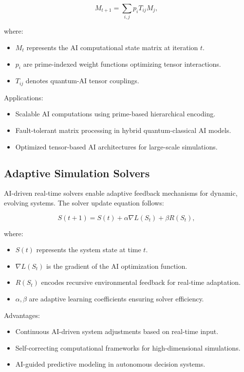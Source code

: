 \documentclass{article}
\theoremstyle{plain}
\begin{document}
\begin{equation}
M_{t+1} = \sum_{i,j} p_i T_{ij} M_j,
\end{equation}

where:
\begin{itemize}
    \item $M_t$ represents the AI computational state matrix at iteration $t$.
    \item $p_i$ are prime-indexed weight functions optimizing tensor interactions.
    \item $T_{ij}$ denotes quantum-AI tensor couplings.
\end{itemize}

Applications:
\begin{itemize}
    \item Scalable AI computations using prime-based hierarchical encoding.
    \item Fault-tolerant matrix processing in hybrid quantum-classical AI models.
    \item Optimized tensor-based AI architectures for large-scale simulations.
\end{itemize}

\subsection{Adaptive Simulation Solvers}

AI-driven real-time solvers enable adaptive feedback mechanisms for dynamic, evolving systems. The solver update equation follows:

\begin{equation}
S(t+1) = S(t) + \alpha \nabla L(S_t) + \beta R(S_t),
\end{equation}

where:
\begin{itemize}
    \item $S(t)$ represents the system state at time $t$.
    \item $\nabla L(S_t)$ is the gradient of the AI optimization function.
    \item $R(S_t)$ encodes recursive environmental feedback for real-time adaptation.
    \item $\alpha, \beta$ are adaptive learning coefficients ensuring solver efficiency.
\end{itemize}

Advantages:
\begin{itemize}
    \item Continuous AI-driven system adjustments based on real-time input.
    \item Self-correcting computational frameworks for high-dimensional simulations.
    \item AI-guided predictive modeling in autonomous decision systems.
\end{itemize}
\end{document}
